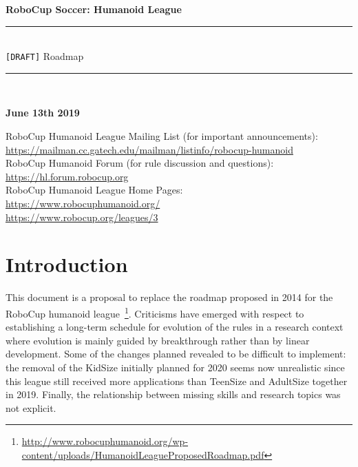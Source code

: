 \documentclass{article}
\begin{document}
\begin{center}
  {\Huge \bfseries
    RoboCup Soccer: Humanoid League
    \\
    \rule{\textwidth}{0.1cm}\\
    \vspace{0.5cm}
    \verb![DRAFT]! Roadmap\\
    \vspace{0.5cm}
    \rule{\textwidth}{0.1cm}\\
  }
  {\bfseries June 13th 2019}
\end{center}

RoboCup Humanoid League Mailing List (for important announcements):\\
\url{https://mailman.cc.gatech.edu/mailman/listinfo/robocup-humanoid}
\\
RoboCup Humanoid Forum (for rule discussion and questions):\\
\url{https://hl.forum.robocup.org}
\\
RoboCup Humanoid League Home Pages:\\
\url{https://www.robocuphumanoid.org/}\\
\url{https://www.robocup.org/leagues/3}\\

\clearpage


\section{Introduction}

This document is a proposal to replace the roadmap proposed in 2014 for the
RoboCup humanoid
league~\footnote{\url{http://www.robocuphumanoid.org/wp-content/uploads/HumanoidLeagueProposedRoadmap.pdf}}. Criticisms
have emerged with respect to establishing a long-term schedule for evolution of
the rules in a research context where evolution is mainly guided by breakthrough
rather than by linear development. Some of the changes planned revealed to be
difficult to implement: the removal of the KidSize initially planned for 2020
seems now unrealistic since this league still received more applications than
TeenSize and AdultSize together in 2019. Finally, the relationship between
missing skills and research topics was not explicit.
\end{document}
